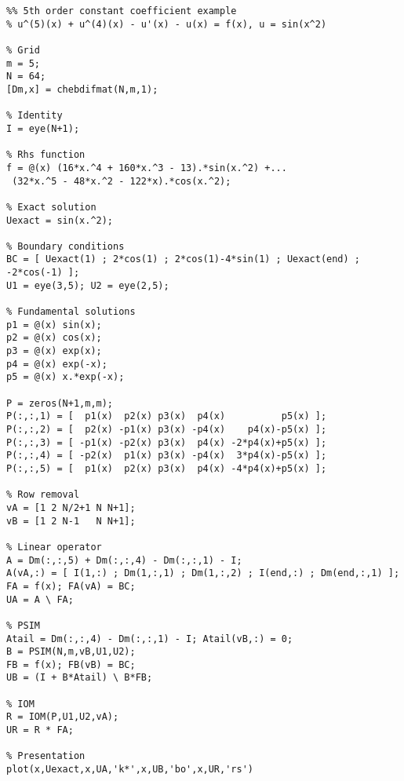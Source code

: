 \documentclass{sfuthesis}
\begin{document}
\begin{appendices}
\newpage

\begin{verbatim}
%% 5th order constant coefficient example
% u^(5)(x) + u^(4)(x) - u'(x) - u(x) = f(x), u = sin(x^2)

% Grid
m = 5;
N = 64;
[Dm,x] = chebdifmat(N,m,1);

% Identity
I = eye(N+1);

% Rhs function
f = @(x) (16*x.^4 + 160*x.^3 - 13).*sin(x.^2) +...
 (32*x.^5 - 48*x.^2 - 122*x).*cos(x.^2);

% Exact solution
Uexact = sin(x.^2);

% Boundary conditions
BC = [ Uexact(1) ; 2*cos(1) ; 2*cos(1)-4*sin(1) ; Uexact(end) ; -2*cos(-1) ];
U1 = eye(3,5); U2 = eye(2,5);

% Fundamental solutions
p1 = @(x) sin(x);
p2 = @(x) cos(x);
p3 = @(x) exp(x);
p4 = @(x) exp(-x);
p5 = @(x) x.*exp(-x);

P = zeros(N+1,m,m);
P(:,:,1) = [  p1(x)  p2(x) p3(x)  p4(x)          p5(x) ];
P(:,:,2) = [  p2(x) -p1(x) p3(x) -p4(x)    p4(x)-p5(x) ];
P(:,:,3) = [ -p1(x) -p2(x) p3(x)  p4(x) -2*p4(x)+p5(x) ];
P(:,:,4) = [ -p2(x)  p1(x) p3(x) -p4(x)  3*p4(x)-p5(x) ];
P(:,:,5) = [  p1(x)  p2(x) p3(x)  p4(x) -4*p4(x)+p5(x) ];

% Row removal
vA = [1 2 N/2+1 N N+1];
vB = [1 2 N-1   N N+1];

% Linear operator
A = Dm(:,:,5) + Dm(:,:,4) - Dm(:,:,1) - I;
A(vA,:) = [ I(1,:) ; Dm(1,:,1) ; Dm(1,:,2) ; I(end,:) ; Dm(end,:,1) ];
FA = f(x); FA(vA) = BC;
UA = A \ FA;

% PSIM
Atail = Dm(:,:,4) - Dm(:,:,1) - I; Atail(vB,:) = 0;
B = PSIM(N,m,vB,U1,U2);
FB = f(x); FB(vB) = BC;
UB = (I + B*Atail) \ B*FB;

% IOM
R = IOM(P,U1,U2,vA);
UR = R * FA;

% Presentation
plot(x,Uexact,x,UA,'k*',x,UB,'bo',x,UR,'rs')
\end{verbatim}

\end{appendices}
\end{document}
